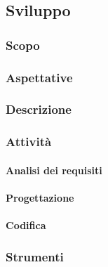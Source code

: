 \subsection{Sviluppo}
		\subsubsection{Scopo}

		\subsubsection{Aspettative}

		\subsubsection{Descrizione}

		\subsubsection{Attività}

			\paragraph{Analisi dei requisiti}

			\paragraph{Progettazione}

			\paragraph*{Codifica}

		\subsubsection{Strumenti}